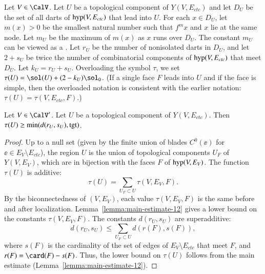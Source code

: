 \documentclass{llncs}
\def\op#1{{\hbox{#1}}}
\begin{document}
\begin{definition}[$D_U$,~$m_U$,~$r_U$,~$s_U$,~$k_U$,~$\tau(U)$]
  Let $V\in \CalV$.  Let $U$ be a topological component of
  $Y(V,E_{ctc})$ and let $D_U$ be the set of all darts of $\op{hyp}(V,E_{ctc})$
 that lead into
  $U$.   For each
  $x\in D_U$, let $m(x) >0$ be the smallest natural number such that
  $f^{m} x$ and $x$ lie at the same node.  Let $m_U$ be the maximum of
  $m(x)$  as $x$ runs over $D_U$.  The constant $m_U$ can be viewed as
  a .  
Let $r_U$ be the number of nonisolated darts in $D_U$, and let $2+s_U$ be twice the
  number of combinatorial components of $\op{hyp}(V,E_{ctc})$ that
  meet $D_U$.  Let $k_U=r_U+s_U$.  Overloading the symbol $\tau$, we
  set $\tau(U) = \sol(U) +  (2-k_U)\sol_0$.   (If a single  face $F$ leads into
  $U$ and if the face is simple, then the overloaded notation is consistent
with the earlier notation: $\tau(U) = \tau(V,E_{ctc},F)$.)
%
\end{definition}

\begin{lemma}\label{lemma:tauU'}
  Let $V\in \CalV'$.
Let $U$ be a topological component of
  $Y(V,E_{ctc})$.   Then $\tau(U)\ge \min(d(r_U,s_U),\op{tgt})$.
\end{lemma}

\begin{proof}
Up to a null set (given by the finite union of blades $C^0(\ee)$ for
$\ee\in E_V\setminus E_{ctc}$), the region $U$ is the union of topological
components $U_F$ of $Y(V,E_V)$, which are in bijection with the faces
$F$ of $\op{hyp}(V,E_V)$.  The function $\tau(U)$ is additive:
\begin{equation}\label{eqn:tau-additive}
\tau(U) = \sum_{U_F\subset U} \tau(V,E_V,F).
\end{equation}
By the biconnectedness of $(V,E_V)$, each value $\tau(V,E_V,F)$ is the
same before and after localization.
Lemma~\ref{lemma:main-estimate-12} gives a lower bound on the
constants $\tau(V,E_V,F)$.  The constants $d(r_U,s_U)$ are superadditive:
\[
d(r_U,s_U) \le \sum_{U_F\subset U} d(r(F),s(F)),
\]
where $s(F)$ is the cardinality of the set of edges of $E_V\setminus
E_{ctc}$ that meet $F$, and $r(F) = \card(F)-s(F)$.  Thus, the 
lower bound on $\tau(U)$ follows from the main estimate
(Lemma~\ref{lemma:main-estimate-12}).
\end{proof}
\end{document}
